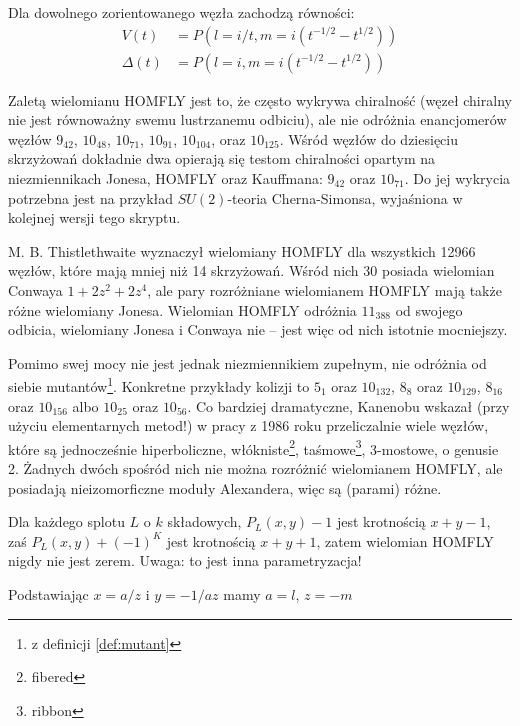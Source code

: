 \begin{proposition}
    Dla dowolnego zorientowanego węzła zachodzą równości:
        \begin{align*}
        V(t) & = P(l = i/t, m = i(t^{-1/2} - t^{1/2})) \\
        \Delta(t) & = P(l = i, m = i(t^{-1/2} - t^{1/2}))
    \end{align*}
\end{proposition}

Zaletą wielomianu HOMFLY jest to, że często wykrywa chiralność (węzeł chiralny nie jest równoważny swemu lustrzanemu odbiciu), ale nie odróżnia enancjomerów węzłów $9_{42}$, $10_{48}$, $10_{71}$, $10_{91}$, $10_{104}$, oraz $10_{125}$.
Wśród węzłów do dziesięciu skrzyżowań dokładnie dwa opierają się testom chiralności opartym na niezmiennikach Jonesa, HOMFLY oraz Kauffmana: $9_{42}$ oraz $10_{71}$.
Do jej wykrycia potrzebna jest na przykład $SU(2)$-teoria Cherna-Simonsa, wyjaśniona w kolejnej wersji tego skryptu.

M. B. Thistlethwaite wyznaczył wielomiany HOMFLY dla wszystkich 12966 węzłów, które mają mniej niż 14 skrzyżowań.
Wśród nich 30 posiada wielomian Conwaya $1 + 2z^2 + 2z^4$, ale pary rozróżniane wielomianem HOMFLY mają także różne wielomiany Jonesa.
Wielomian HOMFLY odróżnia $11_{388}$ od swojego odbicia, wielomiany Jonesa i Conwaya nie -- jest więc od nich istotnie mocniejszy.

Pomimo swej mocy nie jest jednak niezmiennikiem zupełnym, nie odróżnia od siebie mutantów\footnote{z definicji \ref{def:mutant}}.
Konkretne przykłady kolizji to $5_1$ oraz $10_{132}$, $8_{8}$ oraz $10_{129}$, $8_{16}$ oraz $10_{156}$ albo $10_{25}$ oraz $10_{56}$.
Co bardziej dramatyczne, Kanenobu wskazał (przy użyciu elementarnych metod!) w pracy \cite{kanenobu86} z 1986 roku przeliczalnie wiele węzłów, które są jednocześnie hiperboliczne, włókniste\footnote{fibered}, taśmowe\footnote{ribbon}, 3-mostowe, o genusie 2.
Żadnych dwóch spośród nich nie można rozróżnić wielomianem HOMFLY, ale posiadają nieizomorficzne moduły Alexandera, więc są (parami) różne.


Dla każdego splotu $L$ o $k$ składowych, $P_L(x,y) - 1$ jest krotnością $x+y-1$, zaś $P_L(x,y) + (-1)^K$ jest krotnością $x +y + 1$, zatem wielomian HOMFLY nigdy nie jest zerem.
Uwaga: to jest inna parametryzacja!

Podstawiając $x = a/z$ i $y = -1/az$ mamy $a = l$, $z = -m$
